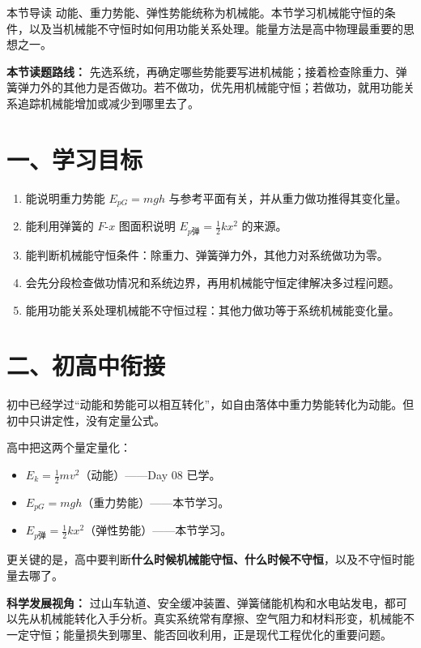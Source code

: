 
\begin{learningbox}{本节导读}
动能、重力势能、弹性势能统称为机械能。本节学习机械能守恒的条件，以及当机械能不守恒时如何用功能关系处理。能量方法是高中物理最重要的思想之一。
\end{learningbox}

\textbf{本节读题路线：} 先选系统，再确定哪些势能要写进机械能；接着检查除重力、弹簧弹力外的其他力是否做功。若不做功，优先用机械能守恒；若做功，就用功能关系追踪机械能增加或减少到哪里去了。

\section*{一、学习目标}

\begin{enumerate}
  \item 能说明重力势能 $E_{pG} = mgh$ 与参考平面有关，并从重力做功推得其变化量。
  \item 能利用弹簧的 $F$-$x$ 图面积说明 $E_{p\text{弹}} = \frac12 kx^2$ 的来源。
  \item 能判断机械能守恒条件：除重力、弹簧弹力外，其他力对系统做功为零。
  \item 会先分段检查做功情况和系统边界，再用机械能守恒定律解决多过程问题。
  \item 能用功能关系处理机械能不守恒过程：其他力做功等于系统机械能变化量。
\end{enumerate}

\section*{二、初高中衔接}

初中已经学过“动能和势能可以相互转化”，如自由落体中重力势能转化为动能。但初中只讲定性，没有定量公式。

高中把这两个量定量化：
\begin{itemize}
  \item $E_k = \frac12 mv^2$（动能）——Day 08 已学。
  \item $E_{pG} = mgh$（重力势能）——本节学习。
  \item $E_{p\text{弹}} = \frac12 kx^2$（弹性势能）——本节学习。
\end{itemize}

更关键的是，高中要判断\textbf{什么时候机械能守恒、什么时候不守恒}，以及不守恒时能量去哪了。

\textbf{科学发展视角：} 过山车轨道、安全缓冲装置、弹簧储能机构和水电站发电，都可以先从机械能转化入手分析。真实系统常有摩擦、空气阻力和材料形变，机械能不一定守恒；能量损失到哪里、能否回收利用，正是现代工程优化的重要问题。

